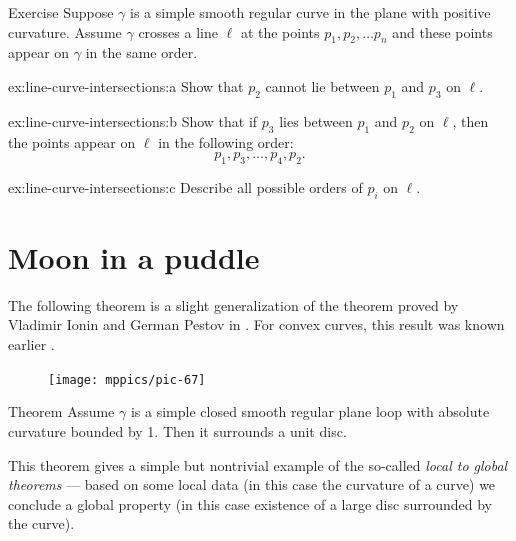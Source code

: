 \begin{thm}{Exercise}\label{ex:line-curve-intersections}
Suppose $\gamma$ is a simple smooth regular curve in the plane with positive curvature.
Assume $\gamma$ crosses a line $\ell$ at the points $p_1,p_2,\dots p_n$ and these points appear on $\gamma$ in the same order.

\begin{subthm}{ex:line-curve-intersections:a} Show that $p_2$ cannot lie between $p_1$ and $p_3$ on $\ell$.
\end{subthm}

\begin{subthm}{ex:line-curve-intersections:b} Show that if $p_3$ lies between $p_1$ and $p_2$ on $\ell$, then the points appear on $\ell$ in the following order:  
\[p_1,p_3,\dots,p_4 ,p_2.\]

\end{subthm}

\begin{subthm}{ex:line-curve-intersections:c}
Describe all possible orders of $p_i$ on $\ell$.

\end{subthm}

\end{thm}

\section{Moon in a puddle}

The following theorem is a slight generalization of the theorem proved by Vladimir Ionin and German Pestov in \cite{pestov-ionin}.
For convex curves, this result was known earlier \cite[\S 24]{blaschke}.


\begin{figure}
\vskip-0mm
\centering
\texttt{[image: mppics/pic-67]}
\vskip0mm
\end{figure}

\begin{thm}{Theorem}\label{thm:moon-orginal}
Assume $\gamma$ is a simple closed smooth regular plane loop with absolute curvature bounded by 1.
Then it surrounds a unit disc.
\end{thm}

This theorem gives a simple but nontrivial example of the so-called \emph{local to global theorems} --- based on some local data (in this case the curvature of a curve) we conclude a global property (in this case existence of a large disc surrounded by the curve).

